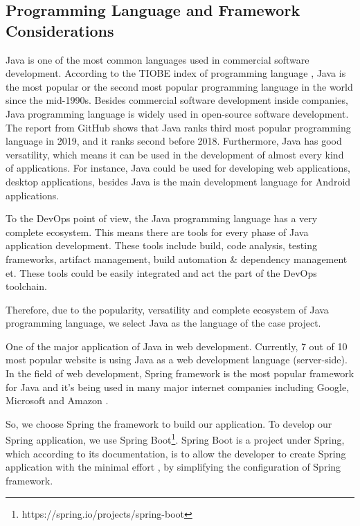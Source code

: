 \subsection{Programming Language and Framework Considerations}
Java is one of the most common languages used in commercial software development. According to the TIOBE index of programming language \cite{indexTIO42:online}, Java is the most popular or the second most popular programming language in the world since the mid-1990s. Besides commercial software development inside companies, Java programming language is widely used in open-source software development. The report \cite{TheState3:online} from GitHub shows that Java ranks third most popular programming language in 2019, and it ranks second before 2018. Furthermore, Java has good versatility, which means it can be used in the development of almost every kind of applications. For instance, Java could be used for developing web applications, desktop applications, besides Java is the main development language for Android applications.
\par
To the DevOps point of view, the Java programming language has a very complete ecosystem. This means there are tools for every phase of Java application development. These tools include build, code analysis, testing frameworks, artifact management, build automation \& dependency management et. These tools could be easily integrated and act the part of the DevOps toolchain.
\par
Therefore, due to the popularity, versatility and complete ecosystem of Java programming language, we select Java as the language of the case project.
\par
One of the major application of Java in web development. Currently, 7 out of 10 \cite{Programm17:online} most popular website is using Java as a web development language (server-side). In the field of web development, Spring framework is the most popular framework for Java and it's being used in many major internet companies including Google, Microsoft and Amazon \cite{SpringWh14:online}.
\par
So, we choose Spring the framework to build our application. To develop our Spring application, we use Spring Boot\footnote{https://spring.io/projects/spring-boot}. Spring Boot is a project under Spring, which according to its documentation, is to allow the developer to create Spring application with the minimal effort \cite{SpringBo84:online}, by simplifying the configuration of Spring framework.

